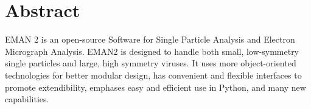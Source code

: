 \section{Abstract}
  \label{ABSTRACT}

EMAN 2 is an open-source Software for Single Particle Analysis and
Electron Micrograph Analysis. EMAN2 is designed to handle both small,
low-symmetry single particles and large, high symmetry viruses. It
uses more object-oriented technologies for better modular design, has
convenient and flexible interfaces to promote extendibility, emphases
easy and efficient use in Python, and many new capabilities.
